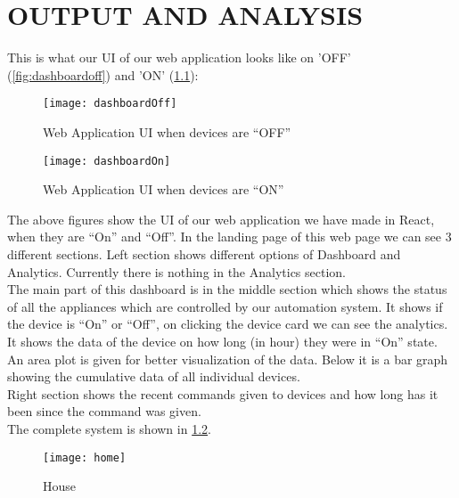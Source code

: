 \chapter{OUTPUT AND ANALYSIS}
This is what our UI of our web application looks like on 'OFF' (\ref{fig:dashboardoff}) and 'ON' (\ref{fig:dashboardon}):
\begin{figure}[h]
    \centering
    \begin{minipage}{1\textwidth}
        \centering
    \texttt{[image: dashboardOff]}
    \caption{Web Application UI when devices are “OFF”}
    \label{fig:dashboardoff}
    \end{minipage}
    \begin{minipage}{1\textwidth}
        \centering
    \texttt{[image: dashboardOn]}
    \caption{Web Application UI when devices are “ON”}
    \label{fig:dashboardon}
    \end{minipage}
\end{figure}

The above figures show the UI of our web application we have made in React, when they are “On” and “Off”. In the landing page of this web page we can see 3 different sections. 
Left section shows different options of Dashboard and Analytics. Currently there is nothing in the Analytics section.\\
The main part of this dashboard is in the middle section which shows the status of all the appliances which are controlled by our automation system. It shows if the device is “On” or “Off”, on clicking the device card we can see the analytics. It shows the data of the device on how long (in hour) they were in “On” state. An area plot is given for better visualization of the data. Below it is a bar graph showing the cumulative data of all individual devices.\\
Right section shows the recent commands given to devices and how long has it been since the command was given.\\

The complete system is shown in \ref{fig:home}.
\begin{figure}[h]
    \centering
    \texttt{[image: home]}
    \caption{House}
    \label{fig:home}
\end{figure}
